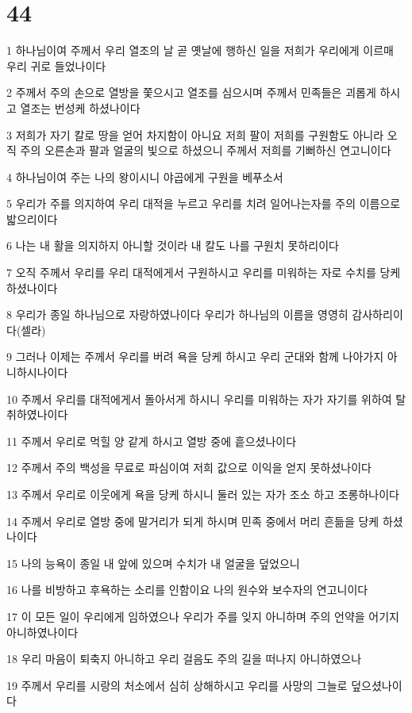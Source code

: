 \chapter{44}

\par 1 하나님이여 주께서 우리 열조의 날 곧 옛날에 행하신 일을 저희가 우리에게 이르매 우리 귀로 들었나이다
\par 2 주께서 주의 손으로 열방을 쫓으시고 열조를 심으시며 주께서 민족들은 괴롭게 하시고 열조는 번성케 하셨나이다
\par 3 저희가 자기 칼로 땅을 얻어 차지함이 아니요 저희 팔이 저희를 구원함도 아니라 오직 주의 오른손과 팔과 얼굴의 빛으로 하셨으니 주께서 저희를 기뻐하신 연고니이다
\par 4 하나님이여 주는 나의 왕이시니 야곱에게 구원을 베푸소서
\par 5 우리가 주를 의지하여 우리 대적을 누르고 우리를 치려 일어나는자를 주의 이름으로 밟으리이다
\par 6 나는 내 활을 의지하지 아니할 것이라 내 칼도 나를 구원치 못하리이다
\par 7 오직 주께서 우리를 우리 대적에게서 구원하시고 우리를 미워하는 자로 수치를 당케 하셨나이다
\par 8 우리가 종일 하나님으로 자랑하였나이다 우리가 하나님의 이름을 영영히 감사하리이다(셀라)
\par 9 그러나 이제는 주께서 우리를 버려 욕을 당케 하시고 우리 군대와 함께 나아가지 아니하시나이다
\par 10 주께서 우리를 대적에게서 돌아서게 하시니 우리를 미워하는 자가 자기를 위하여 탈취하였나이다
\par 11 주께서 우리로 먹힐 양 같게 하시고 열방 중에 흩으셨나이다
\par 12 주께서 주의 백성을 무료로 파심이여 저희 값으로 이익을 얻지 못하셨나이다
\par 13 주께서 우리로 이웃에게 욕을 당케 하시니 둘러 있는 자가 조소 하고 조롱하나이다
\par 14 주께서 우리로 열방 중에 말거리가 되게 하시며 민족 중에서 머리 흔듦을 당케 하셨나이다
\par 15 나의 능욕이 종일 내 앞에 있으며 수치가 내 얼굴을 덮었으니
\par 16 나를 비방하고 후욕하는 소리를 인함이요 나의 원수와 보수자의 연고니이다
\par 17 이 모든 일이 우리에게 임하였으나 우리가 주를 잊지 아니하며 주의 언약을 어기지 아니하였나이다
\par 18 우리 마음이 퇴축지 아니하고 우리 걸음도 주의 길을 떠나지 아니하였으나
\par 19 주께서 우리를 시랑의 처소에서 심히 상해하시고 우리를 사망의 그늘로 덮으셨나이다
